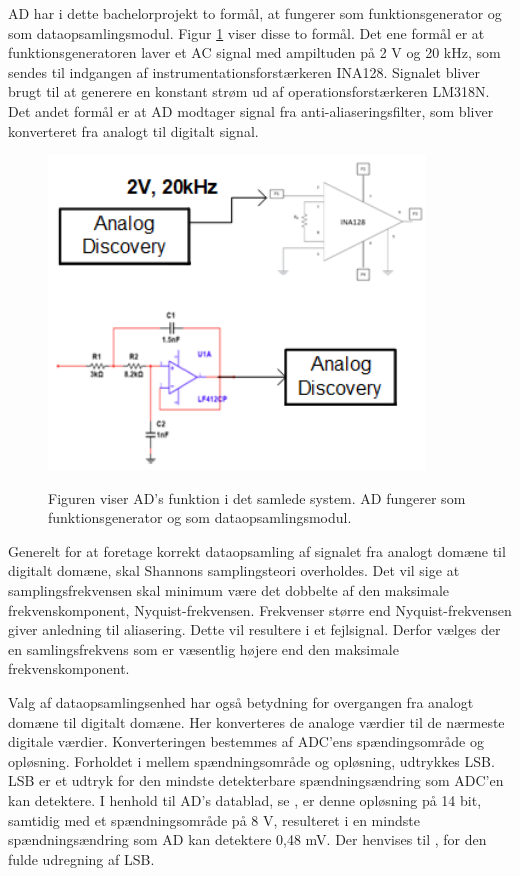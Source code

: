 AD har i dette bachelorprojekt to formål, at fungerer som funktionsgenerator og som dataopsamlingsmodul. Figur \ref{fig:ADogINA128} viser disse to formål. Det ene formål er at funktionsgeneratoren laver et AC signal med ampiltuden på 2 V og 20 kHz, som sendes til indgangen af instrumentationsforstærkeren INA128. Signalet bliver brugt til at generere en konstant strøm ud af operationsforstærkeren LM318N. Det andet formål er at AD modtager signal fra anti-aliaseringsfilter, som bliver konverteret fra analogt til digitalt signal.

\begin{figure}[H]
\centering
{\includegraphics[width=10cm]
{Figure/ADogINA128}}
\caption{Figuren viser AD's funktion i det samlede system. AD fungerer som funktionsgenerator og som dataopsamlingsmodul.}
\label{fig:ADogINA128}
\end{figure}

Generelt for at foretage korrekt dataopsamling af signalet fra analogt domæne til digitalt domæne, skal Shannons samplingsteori overholdes. Det vil sige at samplingsfrekvensen skal minimum være det dobbelte af den maksimale frekvenskomponent, Nyquist-frekvensen. Frekvenser større end Nyquist-frekvensen giver anledning til aliasering. Dette vil resultere i et fejlsignal. Derfor vælges der en samlingsfrekvens som er væsentlig højere end den maksimale frekvenskomponent. 

Valg af dataopsamlingsenhed har også betydning for overgangen fra analogt domæne til digitalt domæne. Her konverteres de analoge værdier til de nærmeste digitale værdier. Konverteringen bestemmes af ADC'ens spændingsområde og opløsning. Forholdet i mellem spændningsområde og opløsning, udtrykkes LSB. LSB er et udtryk for den mindste detekterbare spændningsændring som ADC'en kan detektere. I henhold til AD's datablad, se , er denne opløsning på 14 bit, samtidig med et spændningsområde på 8 V, resulteret i en mindste spændningsændring som AD kan detektere 0,48 mV. Der henvises til , for den fulde udregning af LSB.

